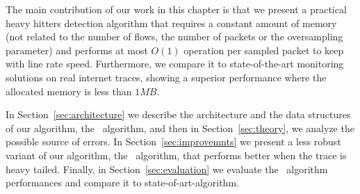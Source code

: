 The main contribution of our work in this chapter is that we present a practical heavy hitters detection algorithm that requires a constant amount of memory (not related to the number of flows, the number of packets or the oversampling parameter) and performs at most $O(1)$ operation per sampled packet to keep with line rate speed. Furthermore, we compare it to state-of-the-art monitoring solutions on real internet traces, showing a superior performance where the allocated memory is less than $1MB$.

In Section~\ref{sec:architecture} we describe the architecture and the data structures of our algorithm, the \cs\ algorithm, and then in Section~\ref{sec:theory}, we analyze  the possible source of errors. In Section~\ref{sec:improvemnts} we present a less robust variant of our algorithm, the \eb\ algorithm, that performs better when the trace is heavy tailed. Finally, in Section~\ref{sec:evaluation} we evaluate the \cs\ algorithm performances and compare it to state-of-art-algorithm.
